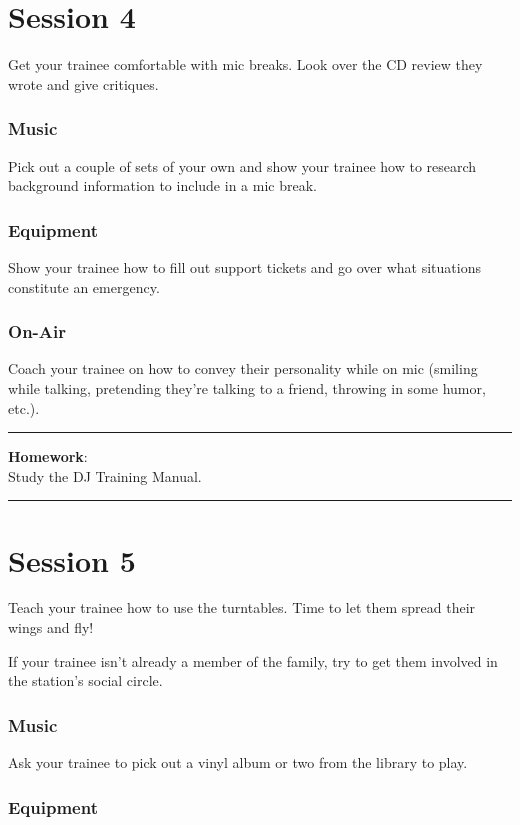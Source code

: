 \documentclass[]{witrman}
\newcommand{\makehomework}[1]{%
\vspace{1mm}
\rule{\textwidth}{1pt}
\textbf{Homework}:\\
#1\\
\rule[2mm]{\textwidth}{1pt}
}
\begin{document}
\chapter{Session 4}

Get your trainee comfortable with mic breaks.  Look over the CD review they
wrote and give critiques.

\subsection{Music}

Pick out a couple of sets of your own and show your trainee how to research
background information to include in a mic break.

\subsection{Equipment}

Show your trainee how to fill out support tickets and go over what situations
constitute an emergency.

\subsection{On-Air}

Coach your trainee on how to convey their personality while on mic (smiling
while talking, pretending they're talking to a friend, throwing in some humor,
etc.).

\makehomework{Study the DJ Training Manual.}


\chapter{Session 5}

Teach your trainee how to use the turntables.  Time to let them spread their
wings and fly!

If your trainee isn't already a member of the family, try to get them involved
in the station's social circle.

\subsection{Music}

Ask your trainee to pick out a vinyl album or two from the library to play.

\subsection{Equipment}
\end{document}
